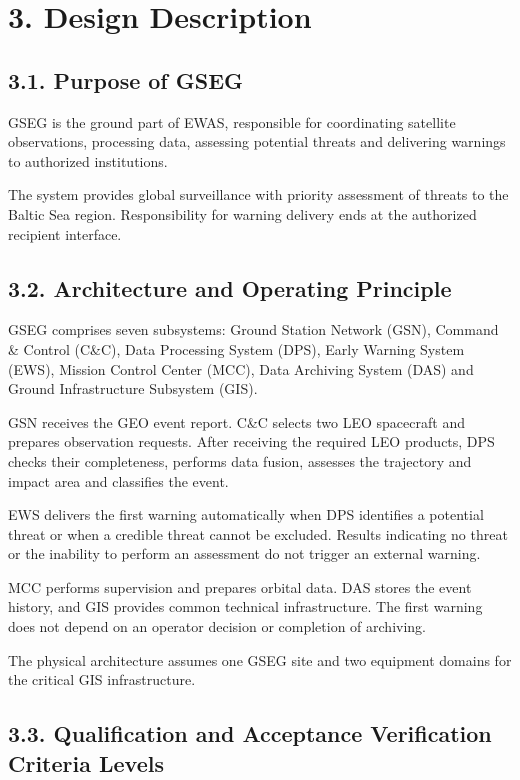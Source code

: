 \section{3. Design Description}\label{ddjf-3}

\subsection{3.1. Purpose of GSEG}\label{ddjf-3-1}

GSEG is the ground part of EWAS, responsible for coordinating satellite observations, processing data, assessing potential threats and delivering warnings to authorized institutions.

The system provides global surveillance with priority assessment of threats to the Baltic Sea region. Responsibility for warning delivery ends at the authorized recipient interface.

\subsection{3.2. Architecture and Operating Principle}\label{ddjf-3-2}

GSEG comprises seven subsystems: Ground Station Network (GSN), Command \& Control (C\&C), Data Processing System (DPS), Early Warning System (EWS), Mission Control Center (MCC), Data Archiving System (DAS) and Ground Infrastructure Subsystem (GIS).

GSN receives the GEO event report. C\&C selects two LEO spacecraft and prepares observation requests. After receiving the required LEO products, DPS checks their completeness, performs data fusion, assesses the trajectory and impact area and classifies the event.

EWS delivers the first warning automatically when DPS identifies a potential threat or when a credible threat cannot be excluded. Results indicating no threat or the inability to perform an assessment do not trigger an external warning.

MCC performs supervision and prepares orbital data. DAS stores the event history, and GIS provides common technical infrastructure. The first warning does not depend on an operator decision or completion of archiving.

The physical architecture assumes one GSEG site and two equipment domains for the critical GIS infrastructure.

\subsection{3.3. Qualification and Acceptance Verification Criteria Levels}\label{ddjf-3-3}


